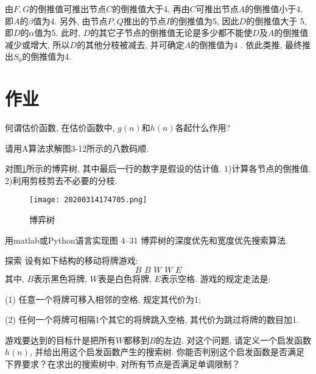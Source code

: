由$F,G$的倒推值可推出节点$C$的倒推值大于4, 再由$C$可推出节点$A$的倒推值小于4, 即$A$的$\beta$值为4. 另外, 由节点$P,Q$推出的节点$I$的倒推值为5, 因此$D$的倒推值大于 5, 即$D$的$\alpha$值为5.
此时, $D$的其它子节点的倒推值无论是多少都不能使$D$及$A$的倒推值减少或增大, 所以$D$的其他分枝被减去, 并可确定$A$的倒推值为4 .
依此类推, 最终推出$S_0$的倒推值为4.
\section{作业}
\begin{think}
何谓估价函数, 在估价函数中, $g(n)$和$h(n)$各起什么作用?
\end{think}

\begin{think}
 请用A算法求解图3-12所示的八数码顺.
\end{think}

\begin{think}
对图\ref{20200314174705fig51}所示的博弈树, 其中最后一行的数字是假设的估计值. 1)计算各节点的倒推值. 2)利用剪枝剪去不必要的分枝.
\begin{figure}[H]
\centering
\texttt{[image: 20200314174705.png]}
\caption{博弈树}
\label{20200314174705fig51}
\end{figure}
\end{think}
\begin{think}
  用matlab或Python语言实现图 4–31 博弈树的深度优先和宽度优先搜索算法.
\end{think}
\begin{custom}[explorecolor]{探索}
设有如下结构的移动将牌游戏:
$$B\,\,	B\,\,		W\,\,		W\,\,		E$$
其中, $B$表示黑色将牌, $W$表是白色将牌, $E$表示空格. 游戏的规定走法是:

(1) 任意一个将牌可移入相邻的空格, 规定其代价为1;

(2) 任何一个将牌可相隔1个其它的将牌跳入空格, 其代价为跳过将牌的数目加1.

游戏要达到的目标什是把所有$W$都移到$B$的左边. 对这个问题, 请定义一个启发函数$h(n)$, 并给出用这个启发函数产生的搜索树. 你能否判别这个启发函数是否满足下界要求？在求出的搜索树中, 对所有节点是否满足单调限制？
\end{custom}




